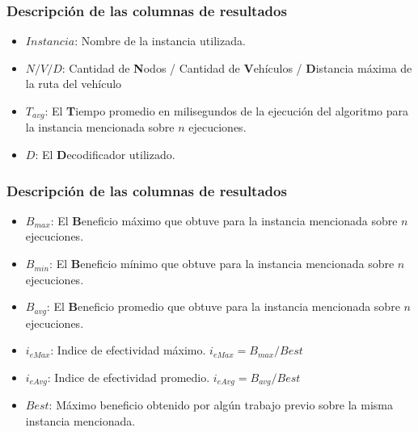 \documentclass{beamer}
\begin{document}

\begin{frame}
\frametitle{Descripción de las columnas de resultados}

\begin{itemize}
	\item \textbf{$Instancia$}: Nombre de la instancia utilizada.
	\item \textbf{$N/V/D$}: Cantidad de \textbf{N}odos / Cantidad de \textbf{V}ehículos / \textbf{D}istancia máxima de la ruta del vehículo
	\item \textbf{$T_{avg}$}: El \textbf{T}iempo promedio en milisegundos de la ejecución del algoritmo para la instancia mencionada sobre $n$ ejecuciones.
	\item \textbf{$D$}: El \textbf{D}ecodificador utilizado.
\end{itemize}

\end{frame}


\begin{frame}
\frametitle{Descripción de las columnas de resultados}

\begin{itemize}
	\item \textbf{$B_{max}$}: El \textbf{B}eneficio máximo que obtuve para la instancia mencionada sobre $n$ ejecuciones.
	\item \textbf{$B_{min}$}: El \textbf{B}eneficio mínimo que obtuve para la instancia mencionada sobre $n$ ejecuciones.
	\item \textbf{$B_{avg}$}: El \textbf{B}eneficio promedio que obtuve para la instancia mencionada sobre $n$ ejecuciones.
	\item \textbf{$i_{eMax}$}: Indice de efectividad máximo. $i_{eMax}=B_{max}/Best$
	\item \textbf{$i_{eAvg}$}: Indice de efectividad promedio. $i_{eAvg}=B_{avg}/Best$
	\item \textbf{$Best$}: Máximo beneficio obtenido por algún trabajo previo sobre la misma instancia mencionada.
\end{itemize}

\end{frame}

\end{document}
